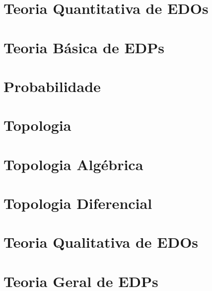 \documentclass{article}
\begin{document}
\section{Teoria Quantitativa de EDOs}

% 
\setcounter{definition}{0}

\section{Teoria Básica de EDPs}

% 
\setcounter{definition}{0}

\section{Probabilidade}

% 
\setcounter{definition}{0}

\section{Topologia}

% 
\setcounter{definition}{0}

\section{Topologia Algébrica}

% 
\setcounter{definition}{0}

\section{Topologia Diferencial}

% 
\setcounter{definition}{0}

\section{Teoria Qualitativa de EDOs}

\setcounter{definition}{0}

\section{Teoria Geral de EDPs}

% 
\setcounter{definition}{0}
\end{document}
